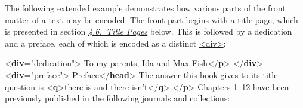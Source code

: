 The following extended example demonstrates how various parts of the front matter of a text may be encoded. The front part begins with a title page, which is presented in section \textit{\hyperref[DSTITL]{4.6.\ Title Pages}} below. This is followed by a dedication and a preface, each of which is encoded as a distinct \hyperref[TEI.div]{<div>}: \par\bgroup{}\exampleFont \begin{shaded}\noindent\mbox{}{<\textbf{div}\hspace*{1em}{type}="{dedication}">}\mbox{}\newline 
{}To my parents, Ida and Max Fish{</\textbf{p}>}\mbox{}\newline 
{</\textbf{div}>}\mbox{}\newline 
{<\textbf{div}\hspace*{1em}{type}="{preface}">}\mbox{}\newline 
{}Preface{</\textbf{head}>}\mbox{}\newline 
{}The answer this book gives to its title question is {<\textbf{q}>}there is\mbox{}\newline 
\hspace*{1em}\hspace*{1em}\hspace*{1em}\hspace*{1em} and there isn't{</\textbf{q}>}.{</\textbf{p}>}\mbox{}\newline 
{}Chapters 1–12 have been previously published in the\mbox{}\newline 
\hspace*{1em}\hspace*{1em} following journals and collections:\mbox{}\newline 
{}\mbox{}\newline 

\end{shaded}
